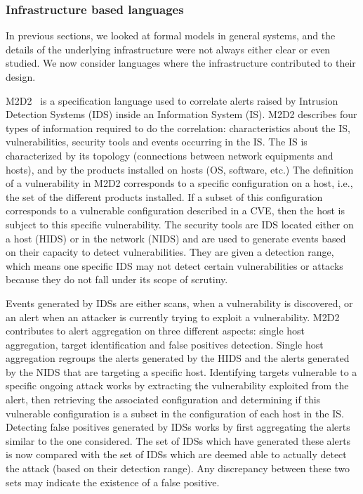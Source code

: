 \subsubsection{Infrastructure based languages}
In previous sections, we looked at formal models in general systems, and the details of the underlying infrastructure were not always either clear or even studied. We now consider languages where the infrastructure contributed to their design.

M2D2~\cite{M2D2-Morin2002} is a specification language used to correlate alerts raised by Intrusion Detection Systems (IDS) inside an Information System (IS).
M2D2 describes four types of information required to do the correlation: characteristics about the IS, vulnerabilities, security tools and events occurring in the IS.
The IS is characterized by its topology (connections between network equipments and hosts), and by the products installed on hosts (\eg OS, software,  etc.)
The definition of a vulnerability in M2D2 corresponds to a specific configuration on a host, i.e., the set of the different products installed.
If a subset of this configuration corresponds to a vulnerable configuration described in a CVE, then the host is subject to this specific vulnerability.
The security tools are IDS located either on a host (HIDS) or in the network (NIDS) and are used to generate events based on their capacity to detect vulnerabilities.
They are given a detection range, which means one specific IDS may not detect certain vulnerabilities or attacks because they do not fall under its scope of scrutiny. 

Events generated by IDSs are either scans, when a vulnerability is discovered, or an alert when an attacker is currently trying to exploit a vulnerability.
M2D2 contributes to alert aggregation on three different aspects: single host aggregation, target identification and false positives detection.
Single host aggregation regroups the alerts generated by the HIDS and the alerts generated by the NIDS that are targeting a specific host.
Identifying targets vulnerable to a specific ongoing attack works by extracting the vulnerability exploited from the alert, then retrieving the associated configuration and determining if this vulnerable configuration is a subset in the configuration of each host in the IS.
Detecting false positives generated by IDSs works by first aggregating the alerts similar to the one considered.
The set of IDSs which have generated these alerts is now compared with the set of IDSs which are deemed able to actually detect the attack (based on their detection range).
Any discrepancy between these two sets may indicate the existence of a false positive.

